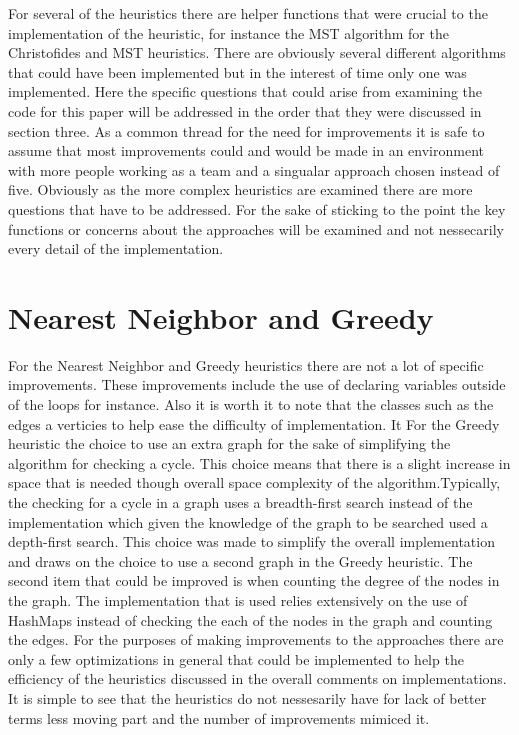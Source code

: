 \documentclass[midd]{thesis}
\newcommand{\tab}{\hspace*{2em}}
\begin{document}
\tab For several of the heuristics there are helper functions that were crucial to the implementation of the heuristic, for instance the MST algorithm for the Christofides and MST heuristics. There are obviously several different algorithms that could have been implemented but in the interest of time only one was implemented. Here the specific questions that could arise from examining the code for this paper will be addressed in the order that they were discussed in section three. As a common thread for the need for improvements it is safe to assume that most improvements could and would be made in an environment with more people working as a team and a singualar approach chosen instead of five. Obviously as the more complex heuristics are examined there are more questions that have to be addressed. For the sake of sticking to the point the key functions or concerns about the approaches will be examined and not nessecarily every detail of the implementation.\\
\section{Nearest Neighbor and Greedy}
\tab For the Nearest Neighbor and Greedy heuristics there are not a lot of specific improvements. These improvements include the use of declaring variables outside of the loops for instance. Also it is worth it to note that the classes such as the edges a verticies to help ease the difficulty of implementation. It  For the Greedy heuristic the choice to use an extra graph for the sake of simplifying the algorithm for checking a cycle. This choice means that there is a slight increase in space that is needed though overall space complexity of the algorithm.Typically, the checking for a cycle in a graph uses a breadth-first search instead of the implementation which given the knowledge of the graph to be searched used a depth-first search. This choice was made to simplify the overall implementation and draws on the choice to use a second graph in the Greedy heuristic. The second item that could be improved is when counting the degree of the nodes in the graph. The implementation that is used relies extensively on the use of HashMaps instead of checking the each of the nodes in the graph and counting the edges. For the purposes of making improvements to the approaches there are only a few optimizations in general that could be implemented to help the efficiency of the heuristics discussed in the overall comments on implementations. It is simple to see that the heuristics do not nessesarily have for lack of better terms less moving part and the number of improvements mimiced it.\\
\end{document}
